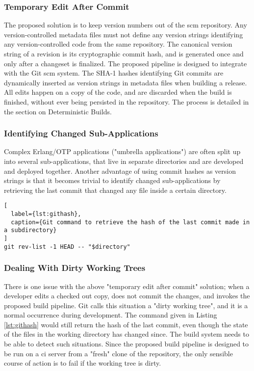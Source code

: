 \subsubsection{Temporary Edit After Commit}
\label{tempeditaftercommit}
The proposed solution is to keep version numbers out of the \acrfull{scm} repository. Any version-controlled metadata files must not define any version strings identifying any version-controlled code from the same repository. The canonical version string of a revision is its cryptographic commit hash, and is generated once and only after a changeset is finalized. The proposed pipeline is designed to integrate with the Git \acrshort{scm} system. The SHA-1 hashes identifying Git commits are dynamically inserted as version strings in metadata files when building a release. All edits happen on a copy of the code, and are discarded when the build is finished, without ever being persisted in the repository. The process is detailed in the section on Deterministic Builds.

\subsubsection{Identifying Changed Sub-Applications}
Complex Erlang/OTP applications ("umbrella applications") are often split up into several sub-applications, that live in separate directories and are developed and deployed together. Another advantage of using commit hashes as version strings is that it becomes trivial to identify changed sub-applications by retrieving the last commit that changed any file inside a certain directory.

\begin{lstlisting}[
  label={lst:githash},
  caption={Git command to retrieve the hash of the last commit made in a subdirectory}
]
git rev-list -1 HEAD -- "$directory"
\end{lstlisting}


\subsubsection{Dealing With Dirty Working Trees}
There is one issue with the above "temporary edit after commit" solution; when a developer edits a checked out copy, does not commit the changes, and invokes the proposed build pipeline. Git calls this situation a "dirty working tree", and it is a normal occurrence during development. The command given in Listing \ref{lst:githash} would still return the hash of the last commit, even though the state of the files in the working directory has changed since. The build system needs to be able to detect such situations. Since the proposed build pipeline is designed to be run on a \acrshort{ci} server from a "fresh" clone of the repository, the only sensible course of action is to fail if the working tree is dirty.

